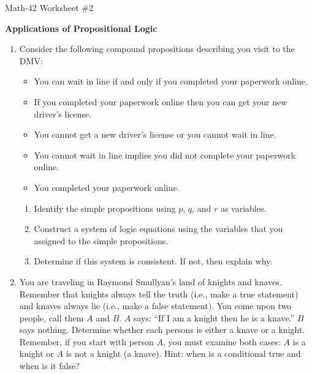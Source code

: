 \documentclass[letterpaper,12pt,fleqn]{article}
\begin{document}
\begin{center}
  \large Math-42 Worksheet \#2

  \textbf{Applications of Propositional Logic}
\end{center}

\vspace{0.5in}

\begin{enumerate}[left=0in,itemsep=0.5in]
\item Consider the following compound propositions describing you visit to the DMV:
  \begin{itemize}
  \item You can wait in line if and only if you completed your paperwork online.
  \item If you completed your paperwork online then you can get your new driver's license.
  \item You cannot get a new driver's license or you cannot wait in line.
  \item You cannot wait in line implies you did not complete your paperwork online.
  \item You completed your paperwork online.
  \end{itemize}
  \begin{enumerate}
  \item Identify the simple propositions using \(p\), \(q\), and \(r\) as variables.
  \item Construct a system of logic equations using the variables that you assigned to the simple propositions.
  \item Determine if this system is consistent.  If not, then explain why.
  \end{enumerate}

\item You are traveling in Raymond Smullyan's land of knights and knaves.  Remember that knights always tell the
  truth (i.e., make a true statement) and knaves always lie (i.e., make a false statement).  You come upon two
  people, call them \(A\) and \(B\).  \(A\) says: ``If I am a knight then he is a knave.''  \(B\) says nothing.
  Determine whether each persons is either a knave or a knight.  Remember, if you start with person \(A\), you
  must examine both cases: \(A\) is a knight or \(A\) is not a knight (a knave).  Hint: when is a conditional
  true and when is it false?


\end{enumerate}
\end{document}
